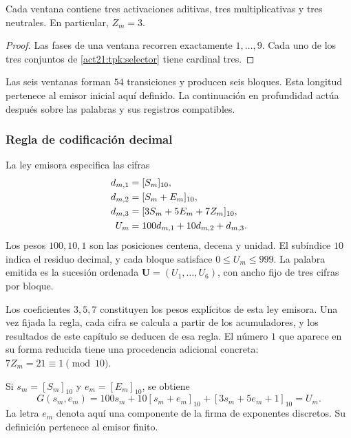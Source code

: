 \begin{lemma}
\label{act21:tpk:tres-eventos}
Cada ventana contiene tres activaciones aditivas, tres multiplicativas y
tres neutrales. En particular, \(Z_m=3\).
\end{lemma}
\begin{proof}
Las fases de una ventana recorren exactamente \(1,\ldots,9\). Cada uno
de los tres conjuntos de \eqref{act21:tpk:selector} tiene cardinal tres.
\end{proof}

Las seis ventanas forman \(54\) transiciones y producen seis bloques.
Esta longitud pertenece al emisor inicial aquí definido. La continuación
en profundidad actúa después sobre las palabras y sus registros compatibles.

\subsubsection{Regla de codificación decimal}

La ley emisora especifica las cifras
\begin{align}
 d_{m,1}&=[S_m]_{10},\notag\\
 d_{m,2}&=[S_m+E_m]_{10},\notag\\
 d_{m,3}&=[3S_m+5E_m+7Z_m]_{10},\notag\\
 U_m&=100d_{m,1}+10d_{m,2}+d_{m,3}.
 \label{act21:tpk:bloque-decimal}
\end{align}
Los pesos \(100,10,1\) son las posiciones centena, decena y unidad.
El subíndice \(10\) indica el residuo decimal, y cada bloque satisface
\(0\leq U_m\leq999\). La palabra emitida es la sucesión ordenada
\(\mathbf U=(U_1,\ldots,U_6)\), con ancho fijo de tres cifras por bloque.

Los coeficientes \(3,5,7\) constituyen los pesos explícitos de esta ley
emisora. Una vez fijada la regla, cada cifra se calcula a partir de los
acumuladores, y los resultados de este capítulo se deducen de esa regla.
El número \(1\) que aparece en su forma reducida tiene una procedencia
adicional concreta: \(7Z_m=21\equiv1\pmod{10}\).

Si \(s_m=[S_m]_{10}\) y \(e_m=[E_m]_{10}\), se obtiene
\begin{equation}
 G(s_m,e_m)=100s_m+10[s_m+e_m]_{10}
                   +[3s_m+5e_m+1]_{10}=U_m.
 \label{act21:tpk:acoplamiento-firmas}
\end{equation}
La letra \(e_m\) denota aquí una componente de la firma de exponentes
discretos. Su definición pertenece al emisor finito.

